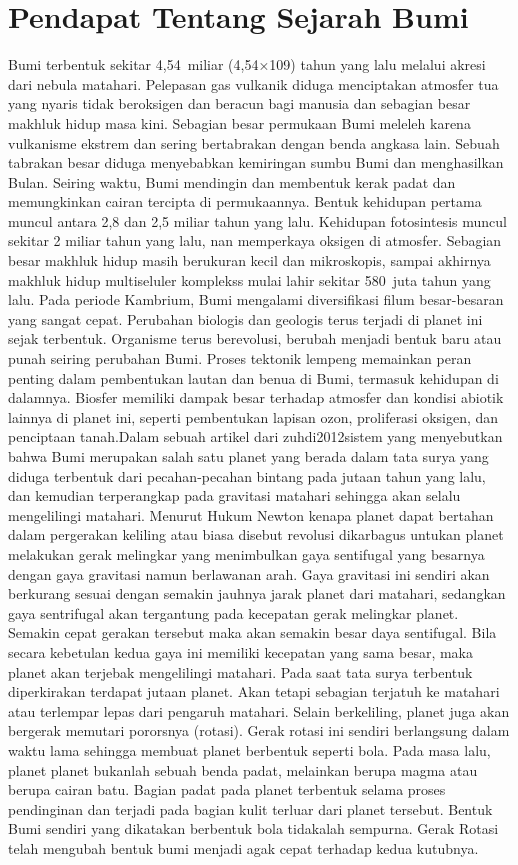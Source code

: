 \section{Pendapat Tentang Sejarah Bumi}
Bumi terbentuk sekitar 4,54 miliar (4,54×109) tahun yang lalu melalui akresi dari nebula matahari. Pelepasan gas vulkanik diduga menciptakan atmosfer tua yang nyaris tidak beroksigen dan beracun bagi manusia dan sebagian besar makhluk hidup masa kini. Sebagian besar permukaan Bumi meleleh karena vulkanisme ekstrem dan sering bertabrakan dengan benda angkasa lain. Sebuah tabrakan besar diduga menyebabkan kemiringan sumbu Bumi dan menghasilkan Bulan. Seiring waktu, Bumi mendingin dan membentuk kerak padat dan memungkinkan cairan tercipta di permukaannya. Bentuk kehidupan pertama muncul antara 2,8 dan 2,5 miliar tahun yang lalu. Kehidupan fotosintesis muncul sekitar 2 miliar tahun yang lalu, nan memperkaya oksigen di atmosfer. Sebagian besar makhluk hidup masih berukuran kecil dan mikroskopis, sampai akhirnya makhluk hidup multiseluler komplekss mulai lahir sekitar 580 juta tahun yang lalu. Pada periode Kambrium, Bumi mengalami diversifikasi filum besar-besaran yang sangat cepat. Perubahan biologis dan geologis terus terjadi di planet ini sejak terbentuk. Organisme terus berevolusi, berubah menjadi bentuk baru atau punah seiring perubahan Bumi. Proses tektonik lempeng memainkan peran penting dalam pembentukan lautan dan benua di Bumi, termasuk kehidupan di dalamnya. Biosfer memiliki dampak besar terhadap atmosfer dan kondisi abiotik lainnya di planet ini, seperti pembentukan lapisan ozon, proliferasi oksigen, dan penciptaan tanah.Dalam sebuah artikel dari zuhdi2012sistem yang menyebutkan bahwa Bumi merupakan salah satu planet yang berada dalam tata surya yang diduga terbentuk dari pecahan-pecahan bintang pada jutaan tahun yang lalu, dan kemudian terperangkap pada gravitasi matahari sehingga akan selalu mengelilingi matahari. Menurut Hukum Newton kenapa planet dapat bertahan dalam pergerakan keliling atau biasa disebut revolusi dikarbagus untukan planet melakukan gerak melingkar yang menimbulkan gaya sentifugal yang besarnya  dengan gaya gravitasi namun berlawanan arah. Gaya gravitasi ini sendiri akan berkurang sesuai dengan semakin jauhnya jarak planet dari matahari, sedangkan gaya sentrifugal  akan tergantung pada kecepatan gerak melingkar planet. Semakin cepat gerakan tersebut maka akan semakin besar daya sentifugal. Bila secara kebetulan kedua gaya ini memiliki kecepatan yang sama besar, maka planet akan terjebak mengelilingi matahari. Pada saat tata surya terbentuk diperkirakan terdapat jutaan planet. Akan tetapi sebagian terjatuh ke matahari atau terlempar lepas dari pengaruh matahari. Selain berkeliling, planet juga akan bergerak memutari pororsnya (rotasi). Gerak rotasi ini sendiri berlangsung dalam waktu lama sehingga membuat planet berbentuk seperti bola. Pada masa lalu, planet planet bukanlah sebuah benda padat, melainkan berupa magma atau berupa cairan batu. Bagian padat pada planet terbentuk selama proses pendinginan dan terjadi pada bagian kulit terluar dari planet tersebut. Bentuk Bumi sendiri yang dikatakan berbentuk bola tidakalah sempurna. Gerak Rotasi telah mengubah bentuk bumi menjadi agak cepat terhadap kedua kutubnya.\cite{zuhdi2012sistem}



